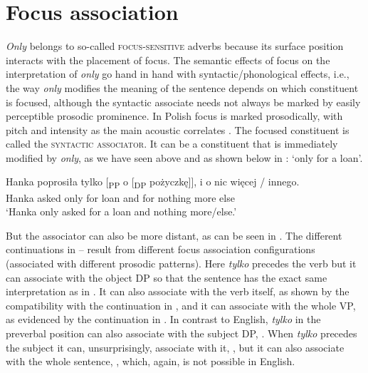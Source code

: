\documentclass[output=paper,colorlinks,citecolor=brown]{langscibook}
\begin{document}
\section{Focus association}
\label{sec:tom:3}

\textit{Only} belongs to so-called \textsc{focus-sensitive} adverbs because its surface position interacts with the placement of focus. The semantic effects of focus on the interpretation of \textit{only} go hand in hand with syntactic/phonological effects, i.e., the way \textit{only} modifies the meaning of the sentence depends on which constituent is focused, although the syntactic associate needs not always be marked by easily perceptible prosodic prominence. In Polish focus is marked prosodically, with pitch and intensity as the main acoustic correlates \citep{hamlaoui+19}. The focused constituent is called the \textsc{syntactic associator}. It can be a constituent that is immediately modified by \textit{only}, as we have seen above and as shown below in : `only for a loan'. 

\ea\label{ex:tom:17}
\gll Hanka   poprosiła   tylko [\textsubscript{PP} o       [\textsubscript{DP} pożyczkę]],   i       o     nic           więcej / innego.\\  
Hanka asked only {} for {} loan and for nothing more {} else  \\
\glt `Hanka only asked for a loan and nothing more/else.’
\z 

\noindent But the associator can also be more distant, as can be seen in . The different continuations in -- result from different focus association configurations (associated with different prosodic patterns). Here \textit{tylko} precedes the verb but it can associate with the object DP so that the sentence has the exact same interpretation as in . It can also associate with the verb itself, as shown by the compatibility with the continuation in , and it can associate with the whole VP, as evidenced by the continuation in . In contrast to English, \textit{tylko} in the preverbal position can also associate with the subject DP, . When \textit{tylko} precedes the subject it can, unsurprisingly, associate with it, , but it can also associate with the whole sentence, , which, again, is not possible in English.
\end{document}
